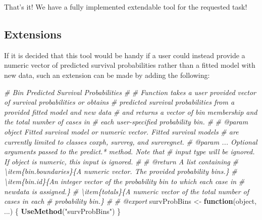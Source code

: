 \documentclass[
]{book}
\newenvironment{Shaded}{\begin{snugshade}}{\end{snugshade}}
\newcommand{\CommentTok}[1]{\textcolor[rgb]{0.56,0.35,0.01}{\textit{#1}}}
\newcommand{\ControlFlowTok}[1]{\textcolor[rgb]{0.13,0.29,0.53}{\textbf{#1}}}
\newcommand{\FunctionTok}[1]{\textcolor[rgb]{0.13,0.29,0.53}{\textbf{#1}}}
\newcommand{\NormalTok}[1]{#1}
\newcommand{\OtherTok}[1]{\textcolor[rgb]{0.56,0.35,0.01}{#1}}
\newcommand{\StringTok}[1]{\textcolor[rgb]{0.31,0.60,0.02}{#1}}
\begin{document}
That's it! We have a fully implemented extendable tool for the requested task!

\hypertarget{extensions}{%
\subsection{Extensions}\label{extensions}}

If it is decided that this tool would be handy if a user could instead provide a numeric vector of predicted survival probabilities rather than a fitted model with new data, such an extension can be made by adding the following:

\begin{Shaded}
\begin{Highlighting}[]
\CommentTok{\#\textquotesingle{} Bin Predicted Survival Probabilities}
\CommentTok{\#\textquotesingle{} }
\CommentTok{\#\textquotesingle{} Function takes a user provided vector of survival probabilities or obtains}
\CommentTok{\#\textquotesingle{}   predicted survival probabilities from a provided fitted model and new data}
\CommentTok{\#\textquotesingle{}   and returns a vector of bin membership and the total number of cases in}
\CommentTok{\#\textquotesingle{}   each user{-}specified probability bin.}
\CommentTok{\#\textquotesingle{}   }
\CommentTok{\#\textquotesingle{} @param object Fitted survival model or numeric vector. Fitted survival models}
\CommentTok{\#\textquotesingle{}   are currently limited to classes \textasciigrave{}coxph\textasciigrave{}, \textasciigrave{}survreg\textasciigrave{}, and \textasciigrave{}survregnet\textasciigrave{}.}
\CommentTok{\#\textquotesingle{} @param ... Optional arguments passed to the \textasciigrave{}predict.*\textasciigrave{} method. Note that}
\CommentTok{\#\textquotesingle{}   input \textasciigrave{}type\textasciigrave{} will be ignored. If \textasciigrave{}object\textasciigrave{} is numeric, this input is ignored.}
\CommentTok{\#\textquotesingle{} }
\CommentTok{\#\textquotesingle{} @return A list containing}
\CommentTok{\#\textquotesingle{} \textbackslash{}item\{bin.boundaries\}\{A numeric vector. The provided probability bins.\}}
\CommentTok{\#\textquotesingle{} \textbackslash{}item\{bin.id\}\{An integer vector of the probability bin to which each case in }
\CommentTok{\#\textquotesingle{}   \textasciigrave{}newdata\textasciigrave{} is assigned.\}}
\CommentTok{\#\textquotesingle{} \textbackslash{}item\{totals\}\{A numeric vector of the total number of cases in each }
\CommentTok{\#\textquotesingle{}   probability bin.\}}
\CommentTok{\#\textquotesingle{} }
\CommentTok{\#\textquotesingle{} @export}
\NormalTok{survProbBins }\OtherTok{\textless{}{-}} \ControlFlowTok{function}\NormalTok{(object, ...) \{ }\FunctionTok{UseMethod}\NormalTok{(}\StringTok{"survProbBins"}\NormalTok{) \}}


\end{Highlighting}
\end{Shaded}
\end{document}
